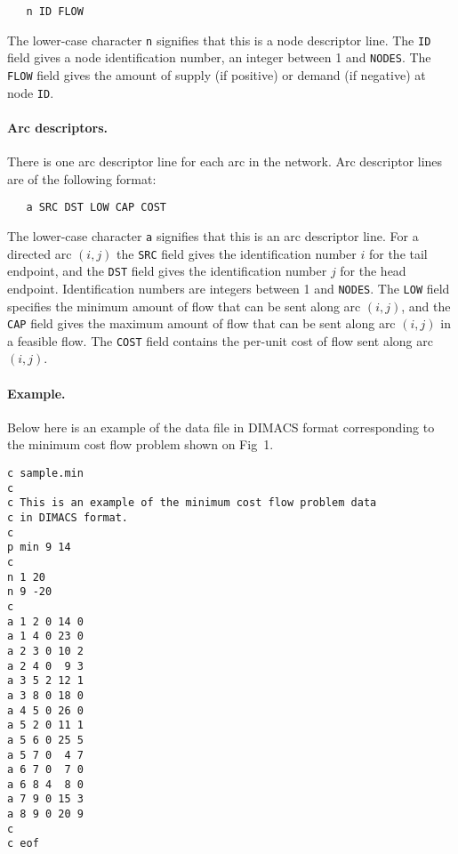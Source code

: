 \documentclass[dvipdfm,11pt]{report}
\begin{document}
\begin{verbatim}
   n ID FLOW
\end{verbatim}

\noindent
The lower-case character \verb|n| signifies that this is a node
descriptor line. The \verb|ID| field gives a node identification number,
an integer between 1 and \verb|NODES|. The \verb|FLOW| field gives the
amount of supply (if positive) or demand (if negative) at node
\verb|ID|.

\paragraph{Arc descriptors.} There is one arc descriptor line for each
arc in the network. Arc descriptor lines are of the following format:

\begin{verbatim}
   a SRC DST LOW CAP COST
\end{verbatim}

\noindent
The lower-case character \verb|a| signifies that this is an arc
descriptor line. For a directed arc $(i,j)$ the \verb|SRC| field gives
the identification number $i$ for the tail endpoint, and the \verb|DST|
field gives the identification number $j$ for the head endpoint.
Identification numbers are integers between 1 and \verb|NODES|. The
\verb|LOW| field specifies the minimum amount of flow that can be sent
along arc $(i,j)$, and the \verb|CAP| field gives the maximum amount of
flow that can be sent along arc $(i,j)$ in a feasible flow. The
\verb|COST| field contains the per-unit cost of flow sent along arc
$(i,j)$.

\paragraph{Example.} Below here is an example of the data file in
DIMACS format corresponding to the minimum cost flow problem shown on
Fig~1.

\begin{footnotesize}
\begin{verbatim}
c sample.min
c
c This is an example of the minimum cost flow problem data
c in DIMACS format.
c
p min 9 14
c
n 1 20
n 9 -20
c
a 1 2 0 14 0
a 1 4 0 23 0
a 2 3 0 10 2
a 2 4 0  9 3
a 3 5 2 12 1
a 3 8 0 18 0
a 4 5 0 26 0
a 5 2 0 11 1
a 5 6 0 25 5
a 5 7 0  4 7
a 6 7 0  7 0
a 6 8 4  8 0
a 7 9 0 15 3
a 8 9 0 20 9
c
c eof
\end{verbatim}
\end{footnotesize}
\end{document}
